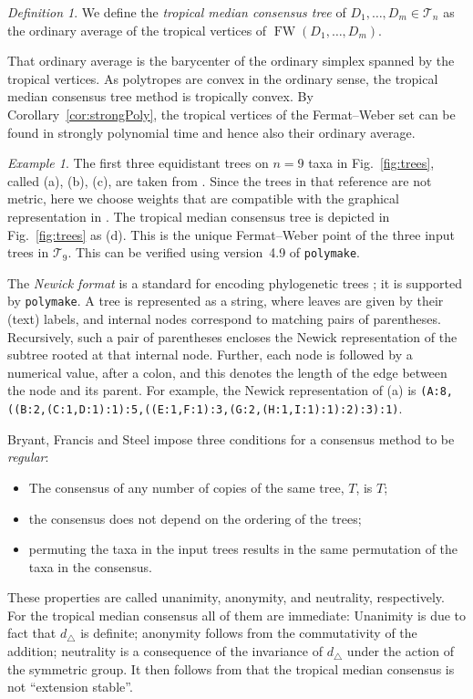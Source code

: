 \documentclass[a4paper,12pt]{amsart}
\newcommand\cT{{\mathcal T}}
\DeclareMathOperator{\FW}{FW} %
\theoremstyle{remark}
\newtheorem{example}[theorem]{Example}
\newtheorem{definition}[theorem]{Definition}
\newcommand\polymake{\texttt{polymake}\xspace}
\begin{document}
\begin{definition}
  We define the \emph{tropical median consensus tree} of $D_1,\dots,D_m\in\cT_n$ as the ordinary average of the tropical vertices of $\FW(D_1,\dots,D_m)$.
\end{definition}

That ordinary average is the barycenter of the ordinary simplex spanned by the tropical vertices.
As polytropes are convex in the ordinary sense, the tropical median consensus tree method is tropically convex.
By Corollary~\ref{cor:strongPoly}, the tropical vertices of the Fermat--Weber set can be found in strongly polynomial time and hence also their ordinary average.

\begin{example}\label{exmp:newick}
  The first three equidistant trees on $n=9$ taxa in Fig.~\ref{fig:trees}, called (a), (b), (c), are taken from \cite[Chapter~7]{CladisticsBook:1998}.
  Since the trees in that reference are not metric, here we choose weights that are compatible with the graphical representation in \cite[Fig.~7.1]{CladisticsBook:1998}.
  The tropical median consensus tree is depicted in Fig.~\ref{fig:trees} as (d).
  This is the unique Fermat--Weber point of the three input trees in $\cT_9$.
  This can be verified using version~4.9 of \polymake \cite{DMV:polymake}.

  The \emph{Newick format} is a standard for encoding phylogenetic trees \cite[p.~590]{Felsenstein:2003}; it is supported by \polymake.
  A tree is represented as a string, where leaves are given by their (text) labels, and internal nodes correspond to matching pairs of parentheses.
  Recursively, such a pair of parentheses encloses the Newick representation of the subtree rooted at that internal node.
  Further, each node is followed by a numerical value, after a colon, and this denotes the length of the edge between the node and its parent.
  For example, the Newick representation of (a) is  \texttt{(A:8,((B:2,(C:1,D:1):1):5,((E:1,F:1):3,(G:2,(H:1,I:1):1):2):3):1)}.
\end{example}

Bryant, Francis and Steel \cite{Bryant+Francis+Steel:2017} impose three conditions for a consensus method to be \emph{regular}:
\begin{itemize}
\item[(U)] The consensus of any number of copies of the same tree, $T$, is $T$;
\item[(A)] the consensus does not depend on the ordering of the trees;
\item[(N)] permuting the taxa in the input trees results in the same permutation of the taxa in the consensus.
\end{itemize}
These properties are called unanimity, anonymity, and neutrality, respectively.
For the tropical median consensus all of them are immediate:
Unanimity is due to fact that $d_\triangle$ is definite; anonymity follows from the commutativity of the addition; neutrality is a consequence of the invariance of $d_\triangle$ under the action of the symmetric group.
It then follows from \cite[Theorem~3]{Bryant+Francis+Steel:2017} that the tropical median consensus is not \enquote{extension stable}.
\end{document}
